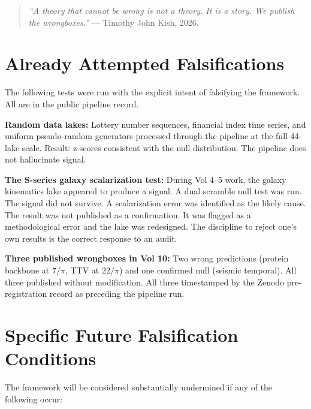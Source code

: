\documentclass[11pt, letterpaper, openany]{book}
\begin{document}
\begin{quote}
\textit{``A theory that cannot be wrong is not a theory.
It is a story. We publish the wrongboxes.''} ---
Timothy John Kish, 2026.
\end{quote}

\section{Already Attempted Falsifications}

The following tests were run with the explicit intent of falsifying
the framework. All are in the public pipeline record.

\textbf{Random data lakes:} Lottery number sequences, financial index
time series, and uniform pseudo-random generators processed through
the pipeline at the full 44-lake scale. Result: z-scores consistent
with the null distribution. The pipeline does not hallucinate signal.

\textbf{The S-series galaxy scalarization test:} During Vol 4--5 work,
the galaxy kinematics lake appeared to produce a signal. A dual scramble
null test was run. The signal did not survive. A scalarization error
was identified as the likely cause. The result was not published as
a confirmation. It was flagged as a methodological error and the lake
was redesigned. The discipline to reject one's own results is the
correct response to an audit.

\textbf{Three published wrongboxes in Vol 10:} Two wrong predictions
(protein backbone at $7/\pi$, TTV at $22/\pi$) and one confirmed null
(seismic temporal). All three published without modification. All
three timestamped by the Zenodo pre-registration record as preceding
the pipeline run.

\section{Specific Future Falsification Conditions}

The framework will be considered substantially undermined if any of
the following occur:
\end{document}
